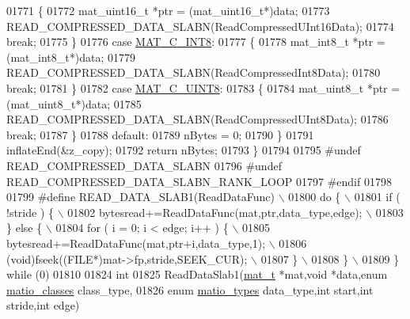 \begin{DoxyCode}
{{{{{{{{{01771         \{
01772             mat\_uint16\_t *ptr = (mat\_uint16\_t*)data;
01773             READ\_COMPRESSED\_DATA\_SLABN(ReadCompressedUInt16Data);
01774             \textcolor{keywordflow}{break};
01775         \}
01776         \textcolor{keywordflow}{case} \hyperlink{group___m_a_t_ggad4d60ae7b709fc81bfd744fb4c857c40a984ff310f9e906100fcff95f704f43c5}{MAT\_C\_INT8}:
01777         \{
01778             mat\_int8\_t *ptr = (mat\_int8\_t*)data;
01779             READ\_COMPRESSED\_DATA\_SLABN(ReadCompressedInt8Data);
01780             \textcolor{keywordflow}{break};
01781         \}
01782         \textcolor{keywordflow}{case} \hyperlink{group___m_a_t_ggad4d60ae7b709fc81bfd744fb4c857c40a81270f8093cb4808e992c1d29d84d4e3}{MAT\_C\_UINT8}:
01783         \{
01784             mat\_uint8\_t *ptr = (mat\_uint8\_t*)data;
01785             READ\_COMPRESSED\_DATA\_SLABN(ReadCompressedUInt8Data);
01786             \textcolor{keywordflow}{break};
01787         \}
01788         \textcolor{keywordflow}{default}:
01789             nBytes = 0;
01790     \}
01791     inflateEnd(&z\_copy);
01792     \textcolor{keywordflow}{return} nBytes;
01793 \}
01794 
01795 \textcolor{preprocessor}{#undef READ\_COMPRESSED\_DATA\_SLABN}
01796 \textcolor{preprocessor}{#undef READ\_COMPRESSED\_DATA\_SLABN\_RANK\_LOOP}
01797 \textcolor{preprocessor}{#endif}
01798 
01799 \textcolor{preprocessor}{#define READ\_DATA\_SLAB1(ReadDataFunc) \(\backslash\)}
01800 \textcolor{preprocessor}{    do \{ \(\backslash\)}
01801 \textcolor{preprocessor}{        if ( !stride ) \{ \(\backslash\)}
01802 \textcolor{preprocessor}{            bytesread+=ReadDataFunc(mat,ptr,data\_type,edge); \(\backslash\)}
01803 \textcolor{preprocessor}{        \} else \{ \(\backslash\)}
01804 \textcolor{preprocessor}{            for ( i = 0; i < edge; i++ ) \{ \(\backslash\)}
01805 \textcolor{preprocessor}{                bytesread+=ReadDataFunc(mat,ptr+i,data\_type,1); \(\backslash\)}
01806 \textcolor{preprocessor}{                (void)fseek((FILE*)mat->fp,stride,SEEK\_CUR); \(\backslash\)}
01807 \textcolor{preprocessor}{            \} \(\backslash\)}
01808 \textcolor{preprocessor}{        \} \(\backslash\)}
01809 \textcolor{preprocessor}{    \} while (0)}
01810 
01824 \textcolor{keywordtype}{int}
01825 ReadDataSlab1(\hyperlink{struct__mat__t}{mat\_t} *mat,\textcolor{keywordtype}{void} *data,\textcolor{keyword}{enum} \hyperlink{group___m_a_t_gad4d60ae7b709fc81bfd744fb4c857c40}{matio\_classes} class\_type,
01826     \textcolor{keyword}{enum} \hyperlink{group___m_a_t_gacf7b3b879282b7ab3a51190e49bf3453}{matio\_types} data\_type,\textcolor{keywordtype}{int} start,\textcolor{keywordtype}{int} stride,\textcolor{keywordtype}{int} edge)
}}}}}}}}}
\end{DoxyCode}
